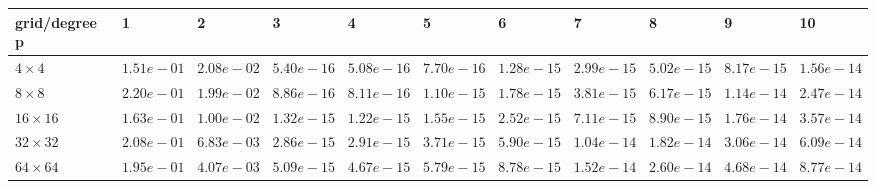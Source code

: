 \begin{tabular}{lllllllllll}
\hline
 grid/degree p   & 1          & 2          & 3          & 4          & 5          & 6          & 7          & 8          & 9          & 10         \\
\hline
 $4 \times 4$    & $1.51e-01$ & $2.08e-02$ & $5.40e-16$ & $5.08e-16$ & $7.70e-16$ & $1.28e-15$ & $2.99e-15$ & $5.02e-15$ & $8.17e-15$ & $1.56e-14$ \\
 $8 \times 8$    & $2.20e-01$ & $1.99e-02$ & $8.86e-16$ & $8.11e-16$ & $1.10e-15$ & $1.78e-15$ & $3.81e-15$ & $6.17e-15$ & $1.14e-14$ & $2.47e-14$ \\
 $16 \times 16$  & $1.63e-01$ & $1.00e-02$ & $1.32e-15$ & $1.22e-15$ & $1.55e-15$ & $2.52e-15$ & $7.11e-15$ & $8.90e-15$ & $1.76e-14$ & $3.57e-14$ \\
 $32 \times 32$  & $2.08e-01$ & $6.83e-03$ & $2.86e-15$ & $2.91e-15$ & $3.71e-15$ & $5.90e-15$ & $1.04e-14$ & $1.82e-14$ & $3.06e-14$ & $6.09e-14$ \\
 $64 \times 64$  & $1.95e-01$ & $4.07e-03$ & $5.09e-15$ & $4.67e-15$ & $5.79e-15$ & $8.78e-15$ & $1.52e-14$ & $2.60e-14$ & $4.68e-14$ & $8.77e-14$ \\
\hline
\end{tabular}